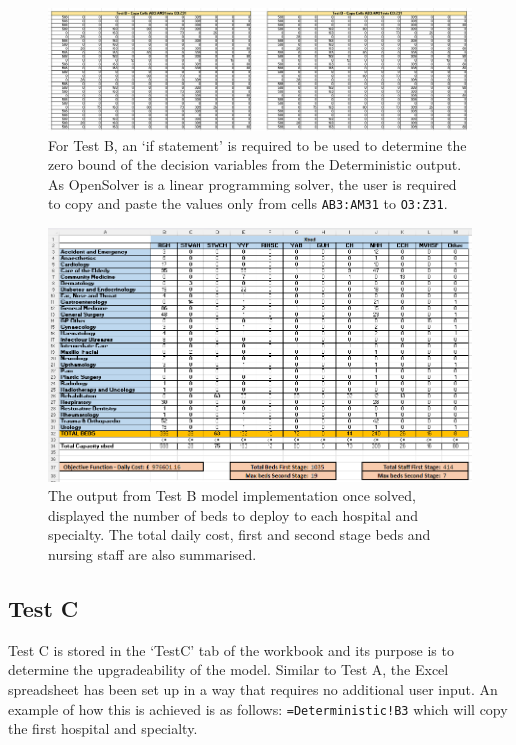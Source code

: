 \documentclass[../thesis.tex]{subfiles}
\begin{document}
\begin{landscape}
\begin{figure}
    \centering
    \includegraphics[scale=0.65]{Chapters/Chapter7/Figures/TestB.png}
    \caption{For Test B, an `if statement' is required to be used to determine the zero bound of the decision variables from the Deterministic output. As OpenSolver is a linear programming solver, the user is required to copy and paste the values only from cells \texttt{AB3:AM31} to \texttt{O3:Z31}.}
    \label{fig:TestB}
\end{figure}
\end{landscape}

\begin{figure}[h!]
    \centering
    \includegraphics[width=\textwidth]{Chapters/Chapter7/Figures/TestBfin.png}
    \caption{The output from Test B model implementation once solved, displayed the number of beds to deploy to each hospital and specialty. The total daily cost, first and second stage beds and nursing staff are also summarised.}
    \label{fig:testBfin}
\end{figure}



\subsection{Test C}
Test C is stored in the `TestC' tab of the workbook and its purpose is to determine the upgradeability of the model. Similar to Test A, the Excel spreadsheet has been set up in a way that requires no additional user input. An example of how this is achieved is as follows: \texttt{=Deterministic!B3} which will copy the first hospital and specialty. 
\end{document}
